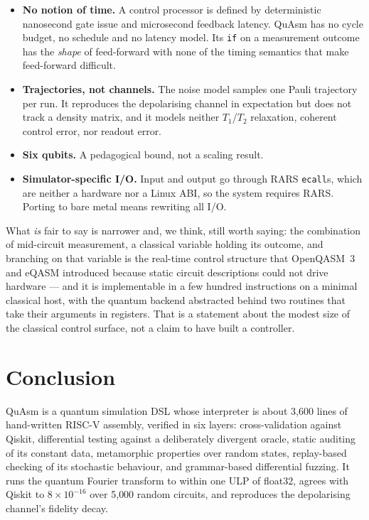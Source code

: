 \documentclass[11pt]{article}
\newcommand{\quasm}{QuAsm}
\begin{document}
\begin{itemize}
  \item \textbf{No notion of time.} A control processor is defined by deterministic
    nanosecond gate issue and microsecond feedback latency. \quasm{} has no cycle budget, no
    schedule and no latency model. Its \texttt{if} on a measurement outcome has the
    \emph{shape} of feed-forward with none of the timing semantics that make feed-forward
    difficult.
  \item \textbf{Trajectories, not channels.} The noise model samples one Pauli trajectory
    per run. It reproduces the depolarising channel in expectation but does not track a
    density matrix, and it models neither $T_1$/$T_2$ relaxation, coherent control error,
    nor readout error.
  \item \textbf{Six qubits.} A pedagogical bound, not a scaling result.
  \item \textbf{Simulator-specific I/O.} Input and output go through RARS \texttt{ecall}s,
    which are neither a hardware nor a Linux ABI, so the system requires RARS. Porting to
    bare metal means rewriting all I/O.
\end{itemize}

What \emph{is} fair to say is narrower and, we think, still worth saying: the combination of
mid-circuit measurement, a classical variable holding its outcome, and branching on that
variable is the real-time control structure that OpenQASM~3 and eQASM introduced because
static circuit descriptions could not drive hardware --- and it is implementable in a few
hundred instructions on a minimal classical host, with the quantum backend abstracted behind
two routines that take their arguments in registers. That is a statement about the modest
size of the classical control surface, not a claim to have built a controller.

\section{Conclusion}

\quasm{} is a quantum simulation DSL whose interpreter is about 3{,}600 lines of hand-written
RISC-V assembly, verified in six layers: cross-validation against Qiskit, differential
testing against a deliberately divergent oracle, static auditing of its constant data,
metamorphic properties over random states, replay-based checking of its stochastic
behaviour, and grammar-based differential fuzzing. It runs the quantum Fourier transform to
within one ULP of float32, agrees with Qiskit to $8 \times 10^{-16}$ over 5{,}000 random
circuits, and reproduces the depolarising channel's fidelity decay.
\end{document}
